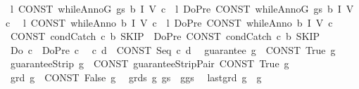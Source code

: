 \begin{isabellebody}
\ \ {\isachardoublequoteopen}l{\isasymbullet}\ {\isacharparenleft}CONST\ whileAnnoG\ gs\ b\ I\ V\ c{\isacharparenright}{\isachardoublequoteclose}\ {\isacharless}{\isacharequal}\ {\isachardoublequoteopen}l{\isasymbullet}\ {\isacharparenleft}{\isacharunderscore}DoPre\ {\isacharparenleft}CONST\ whileAnnoG\ gs\ b\ I\ V\ c{\isacharparenright}{\isacharparenright}{\isachardoublequoteclose}\isanewline
\ \ {\isachardoublequoteopen}l{\isasymbullet}\ {\isacharparenleft}CONST\ whileAnno\ b\ I\ V\ c{\isacharparenright}{\isachardoublequoteclose}\ {\isacharless}{\isacharequal}\ {\isachardoublequoteopen}l{\isasymbullet}\ {\isacharparenleft}{\isacharunderscore}DoPre\ {\isacharparenleft}CONST\ whileAnno\ b\ I\ V\ c{\isacharparenright}{\isacharparenright}{\isachardoublequoteclose}\isanewline
\ \ {\isachardoublequoteopen}CONST\ condCatch\ c\ b\ SKIP{\isachardoublequoteclose}\ {\isacharless}{\isacharequal}\ {\isachardoublequoteopen}{\isacharparenleft}{\isacharunderscore}DoPre\ {\isacharparenleft}CONST\ condCatch\ c\ b\ SKIP{\isacharparenright}{\isacharparenright}{\isachardoublequoteclose}\isanewline
\ \ {\isachardoublequoteopen}{\isacharunderscore}Do\ c{\isachardoublequoteclose}\ {\isacharless}{\isacharequal}\ {\isachardoublequoteopen}{\isacharunderscore}DoPre\ c{\isachardoublequoteclose}\isanewline
\ \ {\isachardoublequoteopen}c{\isacharsemicolon}{\isacharsemicolon}\ d{\isachardoublequoteclose}\ {\isacharequal}{\isacharequal}\ {\isachardoublequoteopen}CONST\ Seq\ c\ d{\isachardoublequoteclose}\isanewline
\ \ {\isachardoublequoteopen}{\isacharunderscore}guarantee\ g{\isachardoublequoteclose}\ {\isacharequal}{\isachargreater}\ {\isachardoublequoteopen}{\isacharparenleft}CONST\ True{\isacharcomma}\ g{\isacharparenright}{\isachardoublequoteclose}\isanewline
\ \ {\isachardoublequoteopen}{\isacharunderscore}guaranteeStrip\ g{\isachardoublequoteclose}\ {\isacharequal}{\isacharequal}\ {\isachardoublequoteopen}CONST\ guaranteeStripPair\ {\isacharparenleft}CONST\ True{\isacharparenright}\ g{\isachardoublequoteclose}\isanewline
\ \ {\isachardoublequoteopen}{\isacharunderscore}grd\ g{\isachardoublequoteclose}\ {\isacharequal}{\isachargreater}\ {\isachardoublequoteopen}{\isacharparenleft}CONST\ False{\isacharcomma}\ g{\isacharparenright}{\isachardoublequoteclose}\isanewline
\ \ {\isachardoublequoteopen}{\isacharunderscore}grds\ g\ gs{\isachardoublequoteclose}\ {\isacharequal}{\isachargreater}\ {\isachardoublequoteopen}g{\isacharhash}gs{\isachardoublequoteclose}\isanewline
\ \ {\isachardoublequoteopen}{\isacharunderscore}last{\isacharunderscore}grd\ g{\isachardoublequoteclose}\ {\isacharequal}{\isachargreater}\ {\isachardoublequoteopen}{\isacharbrackleft}g{\isacharbrackright}{\isachardoublequoteclose}\isanewline

\end{isabellebody}
